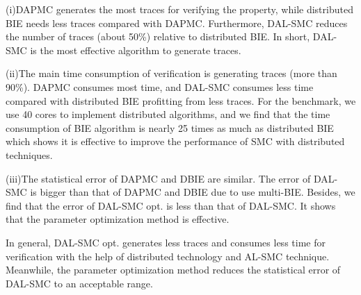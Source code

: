(i)DAPMC generates the most traces for verifying the property, while distributed BIE needs less traces compared with DAPMC. Furthermore, DAL-SMC reduces the number of traces (about 50\%) relative to distributed BIE.  In short, DAL-SMC is the most effective algorithm to generate traces.

(ii)The main time consumption of verification is generating traces (more than 90\%). DAPMC consumes most time, and DAL-SMC consumes less time compared with distributed BIE profitting from less traces. For the benchmark, we use 40 cores to implement distributed algorithms, and we find that the time consumption of BIE algorithm is nearly 25 times as much as distributed BIE which shows it is effective to improve the performance of SMC with distributed techniques. 

(iii)The statistical error of DAPMC and DBIE are similar. The error of DAL-SMC is bigger than that of DAPMC and DBIE due to use multi-BIE. Besides, we find that the error of DAL-SMC opt. is less than that of DAL-SMC. It shows that the parameter optimization method is effective. 

In general, DAL-SMC opt. generates less traces and consumes less time for verification with the help of distributed technology and AL-SMC technique. Meanwhile, the parameter optimization method reduces the statistical error of DAL-SMC to an acceptable range.
